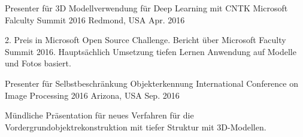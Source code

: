 


\begin{cventries}


\cventry
{Presenter für 3D Modellverwendung für Deep Learning mit CNTK} %
{Microsoft Falculty Summit 2016} %
{Redmond, USA} %
{Apr. 2016} %
{ %
\begin{cvitems}
\item {2. Preis in Microsoft Open Source Challenge. Bericht über Microsoft Faculty Summit 2016. Hauptsächlich Umsetzung tiefen Lernen Anwendung auf Modelle und Fotos basiert.}
\end{cvitems}
}


\cventry
{Presenter für Selbstbeschränkung Objekterkennung} %
{International Conference on Image Processing 2016} %
{Arizona, USA} %
{Sep. 2016} %
{ %
\begin{cvitems}
\item {Mündliche Präsentation für neues Verfahren für die Vordergrundobjektrekonstruktion mit tiefer Struktur mit 3D-Modellen.}
\end{cvitems}
}


\end{cventries}
